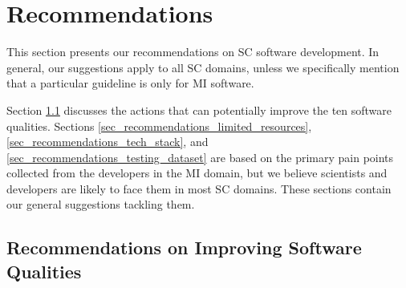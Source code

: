 \chapter{Recommendations}
\label{ch_recommendations}

This section presents our recommendations on SC software development. In general, our suggestions apply to all SC domains, unless we specifically mention that a particular guideline is only for MI software.

Section \ref{sec_recommendations_qualities} discusses the actions that can potentially improve the ten software qualities. Sections \ref{sec_recommendations_limited_resources}, \ref{sec_recommendations_tech_stack}, and \ref{sec_recommendations_testing_dataset} are based on the primary pain points collected from the developers in the MI domain, but we believe scientists and developers are likely to face them in most SC domains. These sections contain our general suggestions tackling them. 

\section{Recommendations on Improving Software Qualities}
\label{sec_recommendations_qualities}


